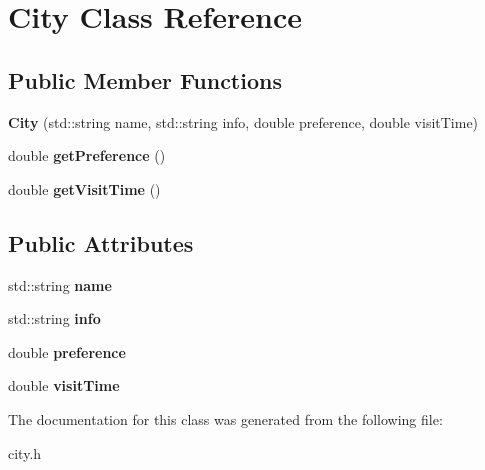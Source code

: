 \hypertarget{class_city}{}\section{City Class Reference}
\label{class_city}
\subsection*{Public Member Functions}
\begin{DoxyCompactItemize}
\item 
\hypertarget{class_city_aea397805274417260d6401998d6d078c}{}{\bfseries City} (std\+::string name, std\+::string info, double preference, double visit\+Time)\label{class_city_aea397805274417260d6401998d6d078c}

\item 
\hypertarget{class_city_aad94270f6763e40fc8e27c5252e7bff3}{}double {\bfseries get\+Preference} ()\label{class_city_aad94270f6763e40fc8e27c5252e7bff3}

\item 
\hypertarget{class_city_aed4f63acb67197f15f6010ce587b74b3}{}double {\bfseries get\+Visit\+Time} ()\label{class_city_aed4f63acb67197f15f6010ce587b74b3}

\end{DoxyCompactItemize}
\subsection*{Public Attributes}
\begin{DoxyCompactItemize}
\item 
\hypertarget{class_city_afea8cd8800a8600fa54af37ac05bf177}{}std\+::string {\bfseries name}\label{class_city_afea8cd8800a8600fa54af37ac05bf177}

\item 
\hypertarget{class_city_a696817be4a02af25c9f05d16fc4f0646}{}std\+::string {\bfseries info}\label{class_city_a696817be4a02af25c9f05d16fc4f0646}

\item 
\hypertarget{class_city_a6077fb7eaa08209925af83a02c3a1c04}{}double {\bfseries preference}\label{class_city_a6077fb7eaa08209925af83a02c3a1c04}

\item 
\hypertarget{class_city_a9d651fe0145698c6210c40548e3e3977}{}double {\bfseries visit\+Time}\label{class_city_a9d651fe0145698c6210c40548e3e3977}

\end{DoxyCompactItemize}


The documentation for this class was generated from the following file\+:\begin{DoxyCompactItemize}
\item 
city.\+h\end{DoxyCompactItemize}
